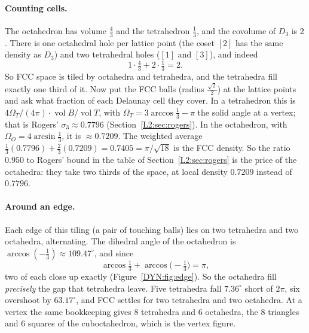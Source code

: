 \documentclass[11pt,openany]{book}
\theoremstyle{plain}
\theoremstyle{definition}
\theoremstyle{remark}
\newcommand{\vol}{\operatorname{vol}}
\newcommand{\Ball}{B}                  %
\begin{document}
\paragraph{Counting cells.} The octahedron has volume $\frac43$ and the tetrahedron $\frac13$, and the
covolume of $D_3$ is $2$. There is one octahedral hole per lattice point (the coset $[2]$ has the same
density as $D_3$) and two tetrahedral holes ($[1]$ and $[3]$), and indeed
\[
  1\cdot\tfrac43+2\cdot\tfrac13=2 .
\]
So FCC space is tiled by octahedra and tetrahedra, and the tetrahedra fill exactly one third of it.
Now put the FCC balls (radius $\frac{\sqrt2}2$) at the lattice points and ask what fraction of each
Delaunay cell they cover. In a tetrahedron this is $4\Omega_T/(4\pi)\cdot\vol\Ball/\vol T$, with
$\Omega_T=3\arccos\frac13-\pi$ the solid angle at a vertex; that is Rogers' $\sigma_3\approx0.7796$
(Section~\ref{L2:sec:rogers}). In the octahedron, with $\Omega_O=4\arcsin\frac13$, it is
$\approx0.7209$. The weighted average
$\frac13(0.7796)+\frac23(0.7209)=0.7405=\pi/\sqrt{18}$ is the FCC density. So the ratio $0.950$ to
Rogers' bound in the table of Section~\ref{L2:sec:rogers} is the price of the octahedra: they take two
thirds of the space, at local density $0.7209$ instead of $0.7796$.

\paragraph{Around an edge.} Each edge of this tiling (a pair of touching balls) lies on two tetrahedra
and two octahedra, alternating. The dihedral angle of the octahedron is $\arccos(-\frac13)\approx109.47^\circ$,
and since
\[
  \arccos\tfrac13+\arccos\big(-\tfrac13\big)=\pi ,
\]
two of each close up exactly (Figure~\ref{DYN:fig:edge}). So the octahedra fill \emph{precisely} the
gap that tetrahedra leave. Five tetrahedra fall $7.36^\circ$ short of $2\pi$, six overshoot by $63.17^\circ$,
and FCC settles for two tetrahedra and two octahedra. At a vertex the same bookkeeping gives $8$ tetrahedra and $6$
octahedra, the $8$ triangles and $6$ squares of the cuboctahedron, which is the vertex figure.
\end{document}
